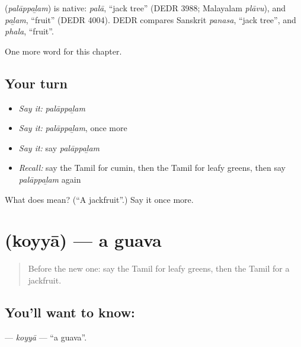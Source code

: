 \begin{cousinweb}
\textbf{} (\emph{palāppaḻam}) is native: \emph{palā}, \textquotedblleft{}jack tree\textquotedblright{} (DEDR 3988; Malayalam \emph{plāvu}), and \emph{paḻam}, \textquotedblleft{}fruit\textquotedblright{} (DEDR 4004). DEDR compares Sanskrit \emph{panasa}, \textquotedblleft{}jack tree\textquotedblright{}, and \emph{phala}, \textquotedblleft{}fruit\textquotedblright{}.
\end{cousinweb}

\begin{grammarlens}[title={What you've built}]
One more word for this chapter.
\end{grammarlens}

\subsection*{Your turn}
\begin{itemize}
\raggedright
  \item \emph{Say it:} \emph{palāppaḻam}
  \item \emph{Say it:} \emph{palāppaḻam}, once more
  \item \emph{Say it:} say \emph{palāppaḻam}
  \item \emph{Recall:} say the Tamil for cumin, then the Tamil for leafy greens, then say \emph{palāppaḻam} again
\end{itemize}

\begin{tcolorbox}[breakable,colback=teal!4,colframe=teal!35!black,title={Before you move on}]
What does  mean? (\textquotedblleft{}A jackfruit\textquotedblright{}.) Say it once more.
\end{tcolorbox}
\section[\texorpdfstring{\ta{கொய்யா} (koyyā)}{கொய்யா (koyyā)}]{ (koyyā) — a guava}

\label{lesson:TA-C139-koyya}



\begin{quote}
Before the new one: say the Tamil for leafy greens, then the Tamil for a jackfruit.
\end{quote}

\subsection*{You'll want to know: }
\textbf{} — \emph{koyyā} — \textquotedblleft{}a guava\textquotedblright{}.

